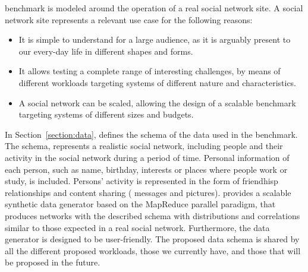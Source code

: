 \ldbcsnb benchmark is modeled around the operation of a real social network
site. A social network site represents a relevant use case for the following
reasons:

\begin{itemize}
    \item It is simple to understand for a large audience, as it is
        arguably present to our every-day life in different shapes and forms.
    \item It allows testing a complete range of interesting
        challenges, by means of different workloads targeting systems of
        different nature and characteristics.
    \item A social network can be scaled, allowing the design of a
        scalable benchmark targeting systems of different sizes and budgets.
\end{itemize}

In Section~\ref{section:data}, \ldbcsnb defines the schema of the data used in
the benchmark. The schema, represents a realistic social network, including
people and their activity in the social network during a period of time.
Personal information of each person, such as name, birthday, interests
or places where people work or study, is included. Persons' activity is
represented in the form of friendhisp relationships and content sharing (\ie
messages and pictures). \ldbcsnb provides a scalable synthetic data generator
based on the MapReduce parallel paradigm, that produces networks with the
described schema with distributions and correlations similar to those expected
in a real social network. Furthermore, the data generator is designed to be
user-friendly. The proposed data schema is shared by all the different proposed
workloads, those we currently have, and those that will be proposed in the future.


